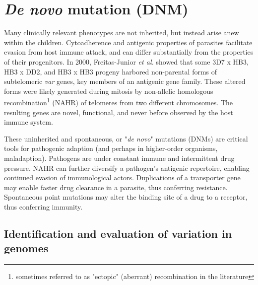 \section{\textit{De novo} mutation (DNM)}

Many clinically relevant phenotypes are not inherited, but instead arise anew within the children.  Cytoadherence and antigenic properties of parasites facilitate evasion from host immune attack, and can differ substantially from the properties of their progenitors.  In 2000, Freitas-Junior \textit{et al.} showed that some 3D7 x HB3, HB3 x DD2, and HB3 x HB3 progeny harbored non-parental forms of subtelomeric \textit{var} genes, key members of an antigenic gene family\cite{FreitasJunior:2000cp}.  These altered forms were likely generated during mitosis by non-allelic homologous recombination\footnote{sometimes referred to as "ectopic" (aberrant) recombination in the literature} (NAHR) of telomeres from two different chromosomes\cite{Duffy:2009cc}.  The resulting genes are novel, functional, and never before observed by the host immune system.

These uninherited and spontaneous, or "\textit{de novo}" mutations (DNMs) are critical tools for pathogenic adaption (and perhaps in higher-order organisms, maladaption).  Pathogens are under constant immune and intermittent drug pressure.  NAHR can further diversify a pathogen's antigenic repertoire, enabling continued evasion of immunological actors.  Duplications of a transporter gene may enable faster drug clearance in a parasite, thus conferring resistance.  Spontaneous point mutations may alter the binding site of a drug to a receptor, thus conferring immunity. 

\subsection{Identification and evaluation of variation in genomes}

